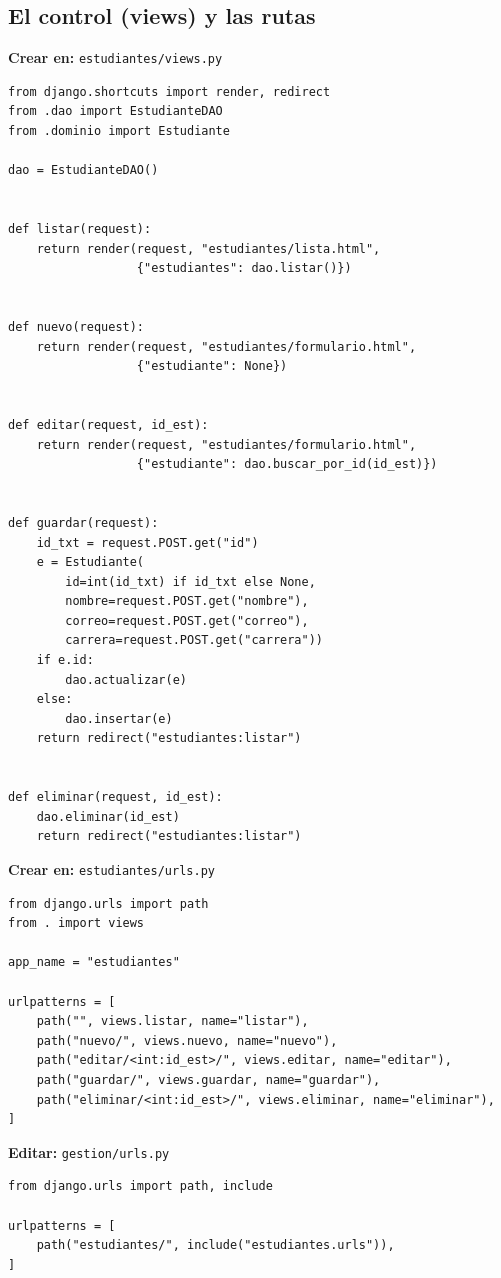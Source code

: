 \documentclass[11pt,a4paper,openany]{book}
\begin{document}
\subsection{El control (views) y las rutas}
\label{ap:crud:django:views}

{\small\textbf{Crear en:} \texttt{estudiantes/views.py}}
\begin{lstlisting}[style=python,caption={views.py (control de la peticion)},label={lst:dj-views}]
from django.shortcuts import render, redirect
from .dao import EstudianteDAO
from .dominio import Estudiante

dao = EstudianteDAO()


def listar(request):
    return render(request, "estudiantes/lista.html",
                  {"estudiantes": dao.listar()})


def nuevo(request):
    return render(request, "estudiantes/formulario.html",
                  {"estudiante": None})


def editar(request, id_est):
    return render(request, "estudiantes/formulario.html",
                  {"estudiante": dao.buscar_por_id(id_est)})


def guardar(request):
    id_txt = request.POST.get("id")
    e = Estudiante(
        id=int(id_txt) if id_txt else None,
        nombre=request.POST.get("nombre"),
        correo=request.POST.get("correo"),
        carrera=request.POST.get("carrera"))
    if e.id:
        dao.actualizar(e)
    else:
        dao.insertar(e)
    return redirect("estudiantes:listar")


def eliminar(request, id_est):
    dao.eliminar(id_est)
    return redirect("estudiantes:listar")
\end{lstlisting}

{\small\textbf{Crear en:} \texttt{estudiantes/urls.py}}
\begin{lstlisting}[style=python,caption={urls.py de la app},label={lst:dj-urls-app}]
from django.urls import path
from . import views

app_name = "estudiantes"

urlpatterns = [
    path("", views.listar, name="listar"),
    path("nuevo/", views.nuevo, name="nuevo"),
    path("editar/<int:id_est>/", views.editar, name="editar"),
    path("guardar/", views.guardar, name="guardar"),
    path("eliminar/<int:id_est>/", views.eliminar, name="eliminar"),
]
\end{lstlisting}

{\small\textbf{Editar:} \texttt{gestion/urls.py}}
\begin{lstlisting}[style=python,caption={urls.py del proyecto (incluye la app)},label={lst:dj-urls-root}]
from django.urls import path, include

urlpatterns = [
    path("estudiantes/", include("estudiantes.urls")),
]
\end{lstlisting}
\end{document}

